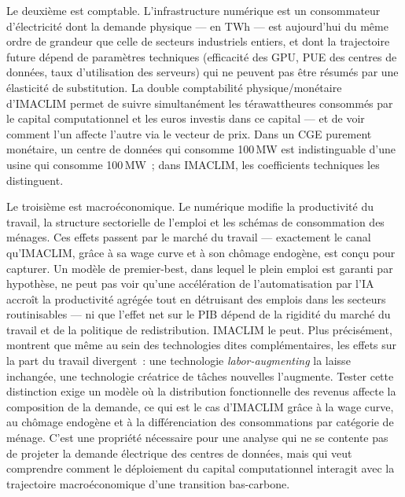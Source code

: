 Le deuxième est comptable. L'infrastructure numérique est un consommateur d'électricité dont la demande physique --- en TWh --- est aujourd'hui du même ordre de grandeur que celle de secteurs industriels entiers, et dont la trajectoire future dépend de paramètres techniques (efficacité des GPU, PUE des centres de données, taux d'utilisation des serveurs) qui ne peuvent pas être résumés par une élasticité de substitution. La double comptabilité physique/monétaire d'IMACLIM permet de suivre simultanément les térawattheures consommés par le capital computationnel et les euros investis dans ce capital --- et de voir comment l'un affecte l'autre via le vecteur de prix. Dans un CGE purement monétaire, un centre de données qui consomme 100\,MW est indistinguable d'une usine qui consomme 100\,MW~; dans IMACLIM, les coefficients techniques les distinguent.

Le troisième est macroéconomique. Le numérique modifie la productivité du travail, la structure sectorielle de l'emploi et les schémas de consommation des ménages. Ces effets passent par le marché du travail --- exactement le canal qu'IMACLIM, grâce à sa wage curve et à son chômage endogène, est conçu pour capturer. Un modèle de premier-best, dans lequel le plein emploi est garanti par hypothèse, ne peut pas voir qu'une accélération de l'automatisation par l'IA accroît la productivité agrégée tout en détruisant des emplois dans les secteurs routinisables --- ni que l'effet net sur le PIB dépend de la rigidité du marché du travail et de la politique de redistribution. IMACLIM le peut. Plus précisément, \textcite{acemoglu_building_2026} montrent que même au sein des technologies dites complémentaires, les effets sur la part du travail divergent~: une technologie \emph{labor-augmenting} la laisse inchangée, une technologie créatrice de tâches nouvelles l'augmente. Tester cette distinction exige un modèle où la distribution fonctionnelle des revenus affecte la composition de la demande, ce qui est le cas d'IMACLIM grâce à la wage curve, au chômage endogène et à la différenciation des consommations par catégorie de ménage. C'est une propriété nécessaire pour une analyse qui ne se contente pas de projeter la demande électrique des centres de données, mais qui veut comprendre comment le déploiement du capital computationnel interagit avec la trajectoire macroéconomique d'une transition bas-carbone.
